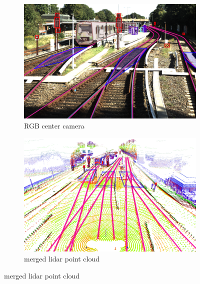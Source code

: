 \begin{figure}[H]
    \centering
    \begin{subfigure}{0.45\textwidth}
        \centering
        \includegraphics[width=\textwidth]{PICs/OSDaR23_dataset/labeled_image.png}
        \caption{\ac{RGB} center camera}
    \end{subfigure}%
    \hspace{0.05\textwidth}
    \begin{subfigure}{0.45\textwidth}
        \centering
        \includegraphics[width=\textwidth]{PICs/OSDaR23_dataset/labeled_3D.png}
        \caption{merged lidar point cloud}
    \end{subfigure}

    \vspace{0.5cm} %


\end{figure}
